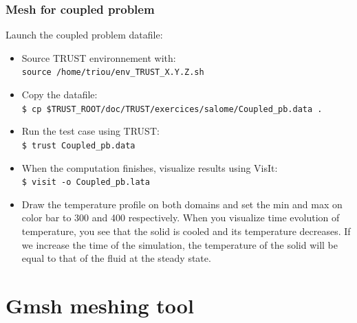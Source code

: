\documentclass[10pt, hyperref={unicode=true,pdfusetitle, bookmarks=true,bookmarksnumbered=false,bookmarksopen=false, breaklinks=false,pdfborder={0 0 1},backref=true,colorlinks=true,linkcolor=darkblue,pageanchor}]{beamer}
\begin{document}
\begin{frame}
\frametitle{Mesh for coupled problem}

\begin{block}{Launch the coupled problem datafile:}
\begin{itemize} 

 \item Source TRUST environnement with:\\
\texttt{source /home/triou/env\_TRUST\_X.Y.Z.sh }\\

 \item Copy the datafile: \\
 \texttt{\$ cp \$TRUST\_ROOT/doc/TRUST/exercices/salome/Coupled\_pb.data .}

 \item Run the test case using TRUST: \\
 \texttt{\$ trust Coupled\_pb.data}

 \item When the computation finishes, visualize results using VisIt:\\
 \texttt{\$ visit -o Coupled\_pb.lata}

 \item Draw the temperature profile on both domains and set the min and max on color bar to 300 and 400 respectively. When you visualize time evolution of temperature, you see that the solid is cooled and its temperature decreases. If we increase the time of the simulation, the temperature of the solid will be equal to that of the fluid at the steady state.
 
\end{itemize}
\end{block}

\end{frame}
\section{{\bf{Gmsh meshing tool}}} \label{gmsh}
\end{document}
